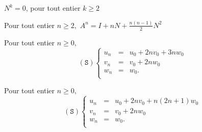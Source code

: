 \begin{multi}
    \item \(N^k = 0\), pour tout entier \(k\ge 2\)
    \item* Pour tout entier \(n \ge 2,\) \(A^n =I+nN+\frac{n(n-1)}{2}N^2  \)
    \item Pour tout entier \(n \ge 0,\)
\[(\mathtt{S}) \left\{\begin{array}{rcc}
u_n&=&u_0+2nv_0+3nw_0\\v_n&=&v_0+2nw_0\\ w_n&=&w_0. \\
\end{array}\right.\]
    \item* Pour tout entier \(n \ge 0,\)
\[(\mathtt{S})  \left\{\begin{array}{rcc}
u_n&=&u_0+2nv_0+n(2n+1)w_0\\v_n&=&v_0+2nw_0\\ w_n&=&w_0. \\
\end{array}\right.\]
\end{multi}


